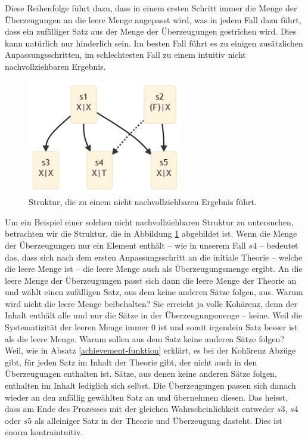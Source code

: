 \documentclass{article}
\begin{document}
Diese Reihenfolge führt dazu, dass in einem ersten Schritt immer die Menge der Überzeugungen an die leere Menge angepasst wird, was in jedem Fall dazu führt, dass ein zufälliger Satz aus der Menge der Überzeugungen gestrichen wird. Dies kann natürlich nur hinderlich sein. Im besten Fall führt es zu einigen zusätzlichen Anpassungsschritten, im schlechtesten Fall zu einem intuitiv nicht nachvollziehbaren Ergebnis.

\begin{figure}[ht]
  \centering
  \includegraphics[width=\textwidth,height=5cm,keepaspectratio]{images/wierd.png}
  \caption{Struktur, die zu einem nicht nachvollziehbaren Ergebnis führt.\label{fig:wierd}}
\end{figure}

Um ein Beispiel einer solchen nicht nachvollziehbaren Struktur zu untersuchen, betrachten wir die Struktur, die in Abbildung \ref{fig:wierd} abgebildet ist. Wenn die Menge der Überzeugungen nur ein Element enthält -- wie in unserem Fall $s4$ -- bedeutet das, dass sich nach dem ersten Anpassungsschritt an die initiale Theorie -- welche die leere Menge ist -- die leere Menge auch als Überzeugungsmenge ergibt. An die leere Menge der Überzeugungen passt sich dann die leere Menge der Theorie an und wählt einen zufälligen Satz, aus dem keine anderen Sätze folgen, aus. Warum wird nicht die leere Menge beibehalten? Sie erreicht ja volle Kohärenz, denn der Inhalt enthält alle und nur die Sätze in der Überzeugungsmenge -- keine. Weil die Systematizität der leeren Menge immer 0 ist und somit irgendein Satz besser ist als die leere Menge. Warum sollen aus dem Satz keine anderen Sätze folgen? Weil, wie in Absatz \ref{achievement-funktion} erklärt, es bei der Kohärenz Abzüge gibt, für jeden Satz im Inhalt der Theorie gibt, der nicht auch in den Überzeugungen enthalten ist. Sätze, aus denen keine anderen Sätze folgen,  enthalten im Inhalt lediglich sich selbst.
Die Überzeugungen passen sich danach wieder an den zufällig gewählten Satz an und übernehmen diesen. Das heisst, dass am Ende des Prozesses mit der gleichen Wahrscheinlichkeit entweder $s3$, $s4$ oder $s5$ als alleiniger Satz in der Theorie und Überzeugung dasteht. Dies ist enorm kontraintuitiv.
\end{document}
